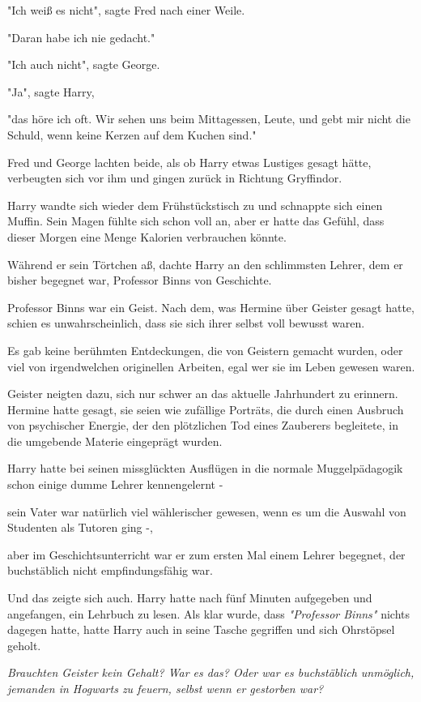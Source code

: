 {"Ich weiß es nicht", sagte Fred nach einer Weile.

"Daran habe ich nie gedacht."

"Ich auch nicht", sagte George.

"Ja", sagte Harry,

"das höre ich oft. Wir sehen uns beim Mittagessen, Leute, und gebt mir nicht die Schuld, wenn keine Kerzen auf dem Kuchen sind."

Fred und George lachten beide, als ob Harry etwas Lustiges gesagt hätte, verbeugten sich vor ihm und gingen zurück in Richtung Gryffindor.

Harry wandte sich wieder dem Frühstückstisch zu und schnappte sich einen Muffin. Sein Magen fühlte sich schon voll an, aber er hatte das Gefühl, dass dieser Morgen eine Menge Kalorien verbrauchen könnte.

Während er sein Törtchen aß, dachte Harry an den schlimmsten Lehrer, dem er bisher begegnet war, Professor Binns von Geschichte.

Professor Binns war ein Geist. Nach dem, was Hermine über Geister gesagt hatte, schien es unwahrscheinlich, dass sie sich ihrer selbst voll bewusst waren.

Es gab keine berühmten Entdeckungen, die von Geistern gemacht wurden, oder viel von irgendwelchen originellen Arbeiten, egal wer sie im Leben gewesen waren.

Geister neigten dazu, sich nur schwer an das aktuelle Jahrhundert zu erinnern. Hermine hatte gesagt, sie seien wie zufällige Porträts, die durch einen Ausbruch von psychischer Energie, der den plötzlichen Tod eines Zauberers begleitete, in die umgebende Materie eingeprägt wurden.

Harry hatte bei seinen missglückten Ausflügen in die normale Muggelpädagogik schon einige dumme Lehrer kennengelernt -

sein Vater war natürlich viel wählerischer gewesen, wenn es um die Auswahl von Studenten als Tutoren ging -,

aber im Geschichtsunterricht war er zum ersten Mal einem Lehrer begegnet, der buchstäblich nicht empfindungsfähig war.

Und das zeigte sich auch. Harry hatte nach fünf Minuten aufgegeben und angefangen, ein Lehrbuch zu lesen. Als klar wurde, dass \emph{"Professor Binns"} nichts dagegen hatte, hatte Harry auch in seine Tasche gegriffen und sich Ohrstöpsel geholt.

\emph{Brauchten Geister kein Gehalt? War es das? Oder war es buchstäblich unmöglich, jemanden in Hogwarts zu feuern, selbst wenn er gestorben war?}

}
